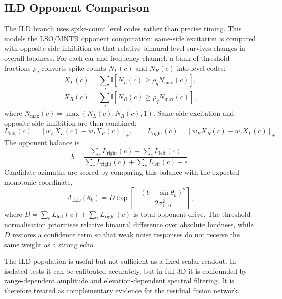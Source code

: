 \subsection{ILD Opponent Comparison}

The ILD branch uses spike-count level codes rather than precise timing. This models the LSO/MNTB opponent computation: same-side excitation is compared with opposite-side inhibition so that relative binaural level survives changes in overall loudness. For each ear and frequency channel, a bank of threshold fractions $\rho_q$ converts spike counts $N_L(c)$ and $N_R(c)$ into level codes:
\begin{equation}
    X_L(c)
    =
    \sum_q
    \mathbb{I}
    \left[
    N_L(c)\geq \rho_q N_{\max}(c)
    \right],
\end{equation}
\begin{equation}
    X_R(c)
    =
    \sum_q
    \mathbb{I}
    \left[
    N_R(c)\geq \rho_q N_{\max}(c)
    \right],
\end{equation}
where $N_{\max}(c)=\max(N_L(c),N_R(c),1)$. Same-side excitation and opposite-side inhibition are then combined:
\begin{equation}
    L_{\mathrm{left}}(c)
    =
    [w_E X_L(c)-w_I X_R(c)]_+,
    \qquad
    L_{\mathrm{right}}(c)
    =
    [w_E X_R(c)-w_I X_L(c)]_+.
\end{equation}
The opponent balance is
\begin{equation}
    b
    =
    \frac{\sum_c L_{\mathrm{right}}(c)-\sum_c L_{\mathrm{left}}(c)}
    {\sum_c L_{\mathrm{right}}(c)+\sum_c L_{\mathrm{left}}(c)+\epsilon}.
\end{equation}
Candidate azimuths are scored by comparing this balance with the expected monotonic coordinate,
\begin{equation}
    A_{\mathrm{ILD}}(\theta_k)
    =
    D\exp
    \left[
    -
    \frac{(b-\sin\theta_k)^2}{2\sigma_{\mathrm{ILD}}^2}
    \right],
\end{equation}
where $D=\sum_c L_{\mathrm{left}}(c)+\sum_c L_{\mathrm{right}}(c)$ is total opponent drive. The threshold normalisation prioritises relative binaural difference over absolute loudness, while $D$ restores a confidence term so that weak noise responses do not receive the same weight as a strong echo.

The ILD population is useful but not sufficient as a fixed scalar readout. In isolated tests it can be calibrated accurately, but in full 3D it is confounded by range-dependent amplitude and elevation-dependent spectral filtering. It is therefore treated as complementary evidence for the residual fusion network.

